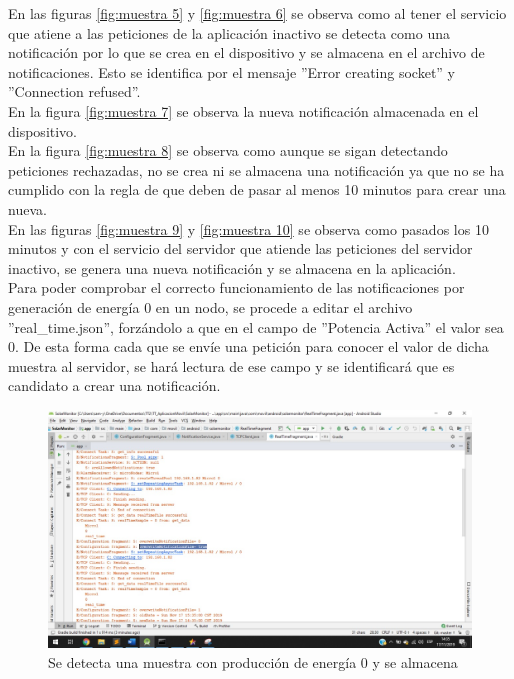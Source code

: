 En las figuras \ref{fig:muestra 5} y \ref{fig:muestra 6} se observa como al tener el servicio que atiene a las peticiones de la aplicación inactivo se detecta como una notificación por lo que se crea en el dispositivo y se almacena en el archivo de notificaciones. Esto se identifica por el mensaje ''Error creating socket'' y ''Connection refused''.
\\ \newline
En la figura \ref{fig:muestra 7} se observa la nueva notificación almacenada en el dispositivo.
\\ \newline
En la figura \ref{fig:muestra 8} se observa como aunque se sigan detectando peticiones rechazadas, no se crea ni se almacena una notificación ya que no se ha cumplido con la regla de que deben de pasar al menos 10 minutos para crear una nueva.
\\ \newline
En las figuras \ref{fig:muestra 9} y \ref{fig:muestra 10} se observa como pasados los 10 minutos y con el servicio del servidor que atiende las peticiones del servidor inactivo, se genera una nueva notificación y se almacena en la aplicación.
\\ \newline
Para poder comprobar el correcto funcionamiento de las notificaciones por generación de energía 0 en un nodo, se procede a editar el archivo ''real\_time.json'', forzándolo a que en el campo de ''Potencia Activa'' el valor sea 0. De esta forma cada que se envíe una petición para conocer el valor de dicha muestra al servidor, se hará lectura de ese campo y se identificará que es candidato a crear una notificación.


\begin{figure}[H]
	\centering
	\includegraphics[scale=.4]{Capitulo4/software/submodulos/images/muestra00.jpg}
	\caption{Se detecta una muestra con producción de energía 0 y se almacena}	
	\label{fig:muestra 11}
\end{figure} 

